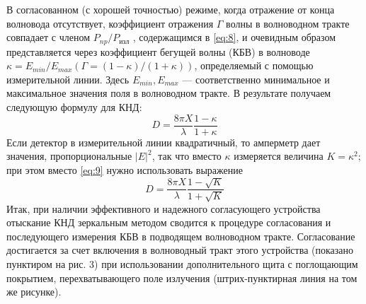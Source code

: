 В согласованном (с хорошей точностью) режиме, когда отражение от конца волновода отсутствует, коэффициент отражения $\Gamma$ 
волны в волноводном тракте совпадает с членом $P_{np}/P_{\text{изл}}$ , содержащимся в \ref{eq:8}, и очевидным образом 
представляется через коэффициент бегущей волны (КБВ) в волноводе $\kappa = E_{min}/E_{max} (\Gamma= (1-\kappa)/(1+\kappa) )$, 
определяемый с помощью измерительной линии. Здесь $E_{min}, E_{max}$ — соответственно минимальное и максимальное значения 
поля в волноводном тракте. В результате получаем следующую формулу для КНД:
\begin{equation}
    D=\frac{8 \pi X}{\lambda} \frac{1-\kappa}{1+\kappa}
    \label{eq:9}
\end{equation}
Если детектор в измерительной линии квадратичный, то амперметр дает значения, пропорциональные $|E|^2$, так что вместо 
$\kappa$ измеряется величина $K = \kappa^2$; при этом вместо \ref{eq:9} нужно использовать выражение
\begin{equation}
    D=\frac{8 \pi X}{\lambda} \frac{1-\sqrt{K}}{1+\sqrt{K}}
    \label{eq:10}
\end{equation}
Итак, при наличии эффективного и надежного согласующего устройства отыскание КНД зеркальным методом сводится к 
процедуре согласования и последующего измерения КБВ в подводящем волноводном тракте. Согласование достигается за 
счет включения в волноводный тракт этого устройства (показано пунктиром на рис. 3) при использовании дополнительного 
щита с поглощающим покрытием, перехватывающего поле излучения (штрих-пунктирная линия на том же рисунке).

